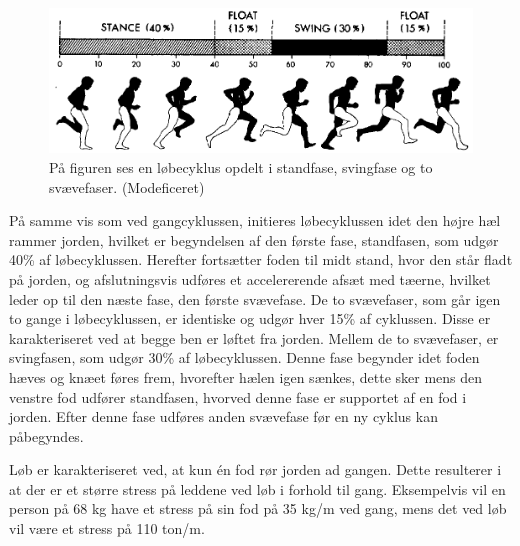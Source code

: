 \begin{figure}[H]
	\centering
	\includegraphics[scale=0.4]{figures/bProblemloesning/loeb_cyklus1.png}
	\caption{På figuren ses en løbecyklus opdelt i standfase, svingfase og to svævefaser. \citep{Adelaar1986} (Modeficeret)}
	\label{fig:loebecyklus}
\end{figure}

På samme vis som ved gangcyklussen, initieres løbecyklussen idet den højre hæl rammer jorden, hvilket er begyndelsen af den første fase, standfasen, som udgør 40\% af løbecyklussen. Herefter fortsætter foden til midt stand, hvor den står fladt på jorden, og afslutningsvis udføres et accelererende afsæt med tæerne, hvilket leder op til den næste fase, den første svævefase. \citep{Adelaar1986,Novacheck1998} \newline
De to svævefaser, som går igen to gange i løbecyklussen, er identiske og udgør hver 15\% af cyklussen. Disse er karakteriseret ved at begge ben er løftet fra jorden. \citep{Adelaar1986,Novacheck1998} \newline
Mellem de to svævefaser, er svingfasen, som udgør 30\% af løbecyklussen. Denne fase begynder idet foden hæves og knæet føres frem, hvorefter hælen igen sænkes, dette sker mens den venstre fod udfører standfasen, hvorved denne fase er supportet af en fod i jorden. Efter denne fase udføres anden svævefase før en ny cyklus kan påbegyndes. \citep{Adelaar1986,Novacheck1998}

Løb er karakteriseret ved, at kun én fod rør jorden ad gangen. Dette resulterer i at der er et større stress på leddene ved løb i forhold til gang. Eksempelvis vil en person på 68 kg have et stress på sin fod på 35 kg/m ved gang, mens det ved løb vil være et stress på 110 ton/m. \citep{Adelaar1986}




